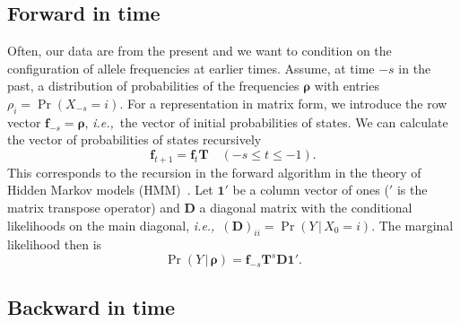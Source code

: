 \documentclass[preprint]{elsarticle}
\newcommand{\bs}[1]{\ensuremath{\boldsymbol{#1}}}
\newcommand\given{{\,|\,}}
\newcommand\eg{{\it e.g.,}}
\newcommand\ie{{\it i.e.,}}
\newcommand\x[1]{\ensuremath{X_{#1}}}
\newcommand\y{\ensuremath{Y}}
\newcommand\s{\ensuremath{s}}
\newcommand\fv[1]{\ensuremath{\mathbf{f}_{#1}}}
\newcommand\oneC{\ensuremath{\mathbf{1}'}}
\begin{document}

\subsection{Forward in time}

Often, our data are from the present and we want to condition on the configuration of allele frequencies at earlier times. Assume, at time $-\s$ in the past, a distribution of probabilities of the frequencies $\bs{\rho}$ with entries $\rho_i = \Pr(\x{-\s}=i)$. For a representation in matrix form, we introduce the row vector $\fv{-\s} = \bs{\rho}$, \ie\ the vector of initial probabilities of states. We can calculate the vector of probabilities of states recursively 
\begin{equation}
\fv{t+1} = \fv{t}\mathbf{T} \quad (-\s \le t \le -1).
\end{equation}
This corresponds to the recursion in the forward algorithm in the theory of Hidden Markov models (HMM)~\citep[\eg][]{Vogl10}. Let $\oneC$ be a column vector of ones ($'$ is the matrix transpose operator) and $\mathbf{D}$ a diagonal matrix with the conditional likelihoods on the main diagonal, \ie\ $(\mathbf{D})_{ii}=\Pr(\y \given \x{0}=i)$. The marginal likelihood then is
\begin{equation}
\Pr(\y \given \bs{\rho}) = \fv{-\s}\mathbf{T}^{\s}\mathbf{D}\oneC.
\end{equation}

\subsection{Backward in time}\label{section:backward}
\end{document}
